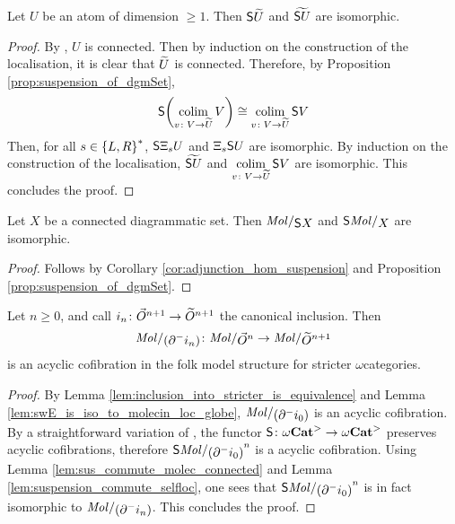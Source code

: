 \begin{lem} \label{lem:suspension_commute_selfloc}
    Let \( U \) be an atom of dimension \( \geq 1 \).
    Then \( \mathsf{S}{\widetilde{U}} \) and \( \widetilde{\mathsf{S}{U}} \) are isomorphic. 
\end{lem}
\begin{proof}
    By \cite[Lemma 3.3.13]{hadzihasanovic2024combinatorics}, \( U \) is connected.
    Then by induction on the construction of the localisation, it is clear that \( \widetilde{U} \) is connected.
    Therefore, by Proposition \ref{prop:suspension_of_dgmSet}, 
    \begin{equation*}
        \mathsf{S}{\left(\operatorname*{colim}_{v \colon V \to \widetilde{U}} V\right)} \cong \operatorname*{colim}_{v \colon V \to \widetilde{U}} \mathsf{S}{V}
    \end{equation*}
    Then, for all \( s \in \left\{ {L, R} \right\}^* \), \( \mathsf{S}{\Xi_{s}U} \) and \( \Xi_{s} \mathsf{S}{U} \) are isomorphic.
    By induction on the construction of the localisation, \( \widetilde{\mathsf{S}{U}} \) and \( \operatorname*{colim}\limits_{v \colon V \to \widetilde{U}} \mathsf{S}{V} \) are isomorphic.    
    This concludes the proof.
\end{proof}

\begin{lem} \label{lem:sus_commute_molec_connected}
    Let \( X \) be a connected diagrammatic set.
    Then \( \molecin{\sus{X}} \) and \( \sus{\molecin{X}} \) are isomorphic.
\end{lem}
\begin{proof}
    Follows by Corollary \ref{cor:adjunction_hom_suspension} and Proposition \ref{prop:suspension_of_dgmSet}. 
\end{proof}

\begin{prop} \label{prop:walking_eq_of_dim_n}
    Let \( n \geq 0 \), and call \( i_n \colon \vec{O}^{n + 1} \to \widetilde{O}^{n + 1} \) the canonical inclusion.
    Then 
    \begin{equation*}
        \molecin{(\bd{}{-} i_n)} \colon \molecin{\dglobe{n}} \to \molecin{\rglobe{n + 1}} 
    \end{equation*}
    is an acyclic cofibration in the folk model structure for stricter \( \omega \)\nbd categories.
\end{prop}
\begin{proof}
    By Lemma \ref{lem:inclusion_into_stricter_is_equivalence} and Lemma \ref{lem:swE_is_iso_to_molecin_loc_globe}, \( \molecin{(\bd{}{-} i_0)} \) is an acyclic cofibration.
    By a straightforward variation of \cite[Proposition 2.8]{hadzihasanovic2024model}, the functor \( \mathsf{S}{} \colon {\omega\mathbf{Cat}}^> \to {\omega\mathbf{Cat}}^> \) preserves acyclic cofibrations, therefore \( \sus{\molecin{(\bd{}{-} i_0)}}^n \) is a acyclic cofibration.
    Using Lemma \ref{lem:sus_commute_molec_connected} and Lemma \ref{lem:suspension_commute_selfloc}, one sees that \( \sus{\molecin{(\bd{}{-} i_0)}}^n \) is in fact isomorphic to \( \molecin{(\bd{}{-} i_n)} \).
    This concludes the proof.
\end{proof}

